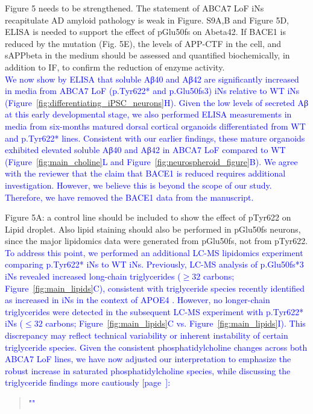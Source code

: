 Figure 5 needs to be strengthened. The statement of ABCA7 LoF iNs recapitulate AD amyloid pathology is weak in Figure. S9A,B and Figure 5D, ELISA is needed to support the effect of pGlu50fs on Abeta42. If BACE1 is reduced by the mutation (Fig. 5E), the levels of APP-CTF in the cell, and sAPPbeta in the medium should be assessed and quantified biochemically, in addition to IF, to confirm the reduction of enzyme activity.\\
\textcolor{blue}{We now show by ELISA that soluble Aβ40 and Aβ42 are significantly increased in media from ABCA7 LoF (p.Tyr622* and p.Glu50fs3) iNs relative to WT iNs (Figure~\ref{fig:differentiating_iPSC_neurons}H). Given the low levels of secreted Aβ at this early developmental stage, we also performed ELISA measurements in media from six-months matured dorsal cortical organoids differentiated from WT and p.Tyr622* lines. Consistent with our earlier findings, these mature organoids exhibited elevated soluble Aβ40 and Aβ42 in ABCA7 LoF compared to WT (Figure~\ref{fig:main_choline}L and Figure~\ref{fig:neurospheroid_figure}B). We agree with the reviewer that the claim that BACE1 is reduced requires additional investigation. However, we believe this is beyond the scope of our study. Therefore, we have removed the BACE1 data from the manuscript.}

Figure 5A: a control line should be included to show the effect of pTyr622 on Lipid droplet. Also lipid staining should also be performed in pGlu50fs neurons, since the major lipidomics data were generated from pGlu50fs, not from pTyr622.\\
\textcolor{blue}{To address this point, we performed an additional LC-MS lipidomics experiment comparing p.Tyr622* iNs to WT iNs. Previously, LC-MS analysis of p.Glu50fs*3 iNs revealed increased long-chain triglycerides ($\geq32$ carbons; Figure~\ref{fig:main_lipids}C), consistent with triglyceride species recently identified as increased in iNs in the context of APOE4 \cite{Haney2024-bp}. However, no longer-chain triglycerides were detected in the subsequent LC-MS experiment with p.Tyr622* iNs ($\leq32$ carbons; Figure~\ref{fig:main_lipids}C vs. Figure~\ref{fig:main_lipids}I). This discrepancy may reflect technical variability or inherent instability of certain triglyceride species. Given the consistent phosphatidylcholine changes across both ABCA7 LoF lines, we have now adjusted our interpretation to emphasize the robust increase in saturated phosphatidylcholine species, while discussing the triglyceride findings more cautiously [page~\pageref{quoteH-label}]:}\\
\begin{quote}
	\textcolor{blue}{"\quoteH"}
\end{quote}


